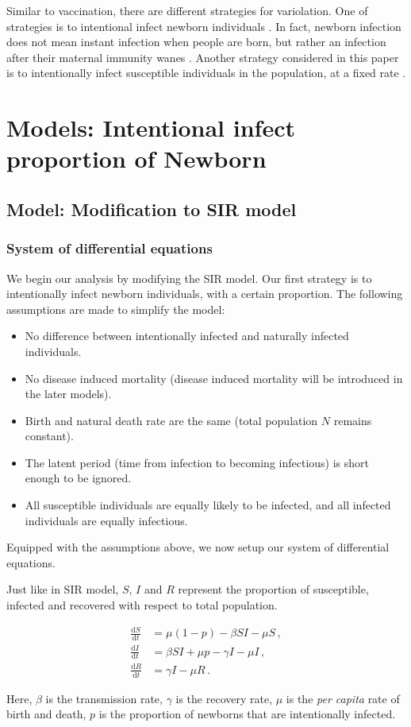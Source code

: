 \documentclass[12pt]{article}
\newcommand\dbyd[2]{\frac{\mathrm d{#1}}{\mathrm d{#2}}}
\begin{document}
Similar to vaccination, there are different strategies for variolation. One of strategies is to intentional infect newborn individuals \cite{dabrera2014case}. In fact, newborn infection does not mean instant infection when people are born, but rather an infection after their maternal immunity wanes \cite{elgert2009immunology}. Another strategy considered in this paper is to intentionally infect susceptible individuals in the population, at a fixed rate \cite{streefland1999patterns}. 

\section{Models: Intentional infect proportion of Newborn}
\subsection{Model: Modification to SIR model}
\subsubsection{System of differential equations}
We begin our analysis by modifying the SIR model. Our first strategy is to intentionally infect newborn individuals, with a certain proportion.  The following assumptions are made to simplify the model:
\begin{itemize}
\item No difference between intentionally infected and naturally infected individuals.
\item No disease induced mortality (disease induced mortality will be introduced in the later models).
\item Birth and natural death rate are the same (total population $N$ remains constant).
\item The latent period (time from infection to becoming infectious) is short enough to be ignored.
\item All susceptible individuals are equally likely to be infected, and all infected individuals are equally infectious.
\end{itemize}
Equipped with the assumptions above, we now setup our system of differential equations.

Just like in SIR model, $S$, $I$ and $R$ represent the proportion of susceptible, infected and recovered with respect to total population.
\begin{linenomath*}
\begin{equation}\label{1}
\begin{split}
\dbyd{S}{t}&=\mu(1-p)- \beta SI-\mu S \,,\\
\dbyd{I}{t}&=\beta SI+\mu p-\gamma I -\mu I\,,\\
\dbyd{R}{t}&=\gamma I-\mu R\,.
\end{split}
\end{equation}
\end{linenomath*}
Here, $\beta$ is the transmission rate, $\gamma$ is the recovery rate,
$\mu$ is the \emph{per capita} rate of birth and death, $p$ is the
proportion of newborns that are intentionally infected.
\end{document}
